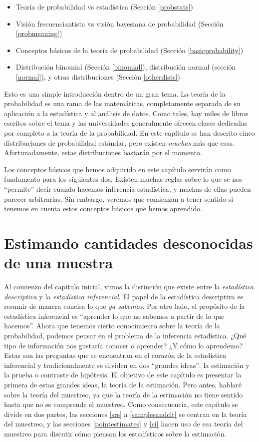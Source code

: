 \documentclass[spanish,]{book}
\providecommand{\tightlist}{%
  \setlength{\itemsep}{0pt}\setlength{\parskip}{0pt}}
\begin{document}
\begin{itemize}
\tightlist
\item
  Teoría de probabilidad vs estadística (Sección \ref{probstats})
\item
  Visión frecuenciantista vs visión bayesiana de probabilidad (Sección
  \ref{probmeaning})
\item
  Conceptos básicos de la teoría de probabilidad (Sección
  \ref{basicprobability})
\item
  Distribución binomial (Sección \ref{binomial}), distribución normal
  (sección \ref{normal}), y otras distribuciones (Sección
  \ref{otherdists})
\end{itemize}

Esto es una simple introducción dentro de un gran tema. La teoría de la
probabilidad es una rama de las matemáticas, completamente separada de
su aplicación a la estadística y al análisis de datos. Como tales, hay
miles de libros escritos sobre el tema y las universidades generalmente
ofrecen clases dedicadas por completo a la teoría de la probabilidad. En
este capítulo se han descrito cinco distribuciones de probabilidad
estándar, pero existen \emph{muchas} más que esas. Afortunadamente,
estas distribuciones bastarán por el momento.

Los conceptos básicos que hemos adquirido en este capítulo servirán como
fundamento para los siguientes dos. Existen muchas reglas sobre lo que
se nos ``permite'' decir cuando hacemos inferencia estadística, y muchas
de ellas pueden parecer arbitrarias. Sin embargo, veremos que comienzan
a tener sentido si tenemos en cuenta estos conceptos básicos que hemos
aprendido.

\chapter{Estimando cantidades desconocidas de una
muestra}\label{estimation}

Al comienzo del capítulo inicial, vimos la distinción que existe entre
la \emph{estadística descriptiva} y la \emph{estadística inferencial}.
El papel de la estadística descriptiva es resumir de manera concisa lo
que \emph{ya sabemos}. Por otro lado, el propósito de la estadística
inferencial es ``aprender lo que no sabemos a partir de lo que
hacemos''. Ahora que tenemos cierto conocimiento sobre la teoría de la
probabilidad, podemos pensar en el problema de la inferencia
estadística. ¿Qué tipo de información nos gustaría conocer o aprender?
¿Y cómo lo aprendemo? Estas son las preguntas que se encuentran en el
corazón de la estadística inferencial y tradicionalmente se dividen en
dos ``grandes ideas'': la estimación y la prueba o contraste de
hipótesis. El objetivo de este capítulo es presentar la primera de estas
grandes ideas, la teoría de la estimación. Pero antes, hablaré sobre la
teoría del muestreo, ya que la teoría de la estimación no tiene sentido
hasta que no se comprende el muestreo. Como consecuencia, este capítulo
se divide en dos partes, las secciones \ref{srs} a \ref{samplesandclt}
se centran en la teoría del muestreo, y las secciones
\ref{pointestimates} y \ref{ci} hacen uso de esa teoría del muestreo
para discutir cómo piensan los estadísticos sobre la estimación.
\end{document}
